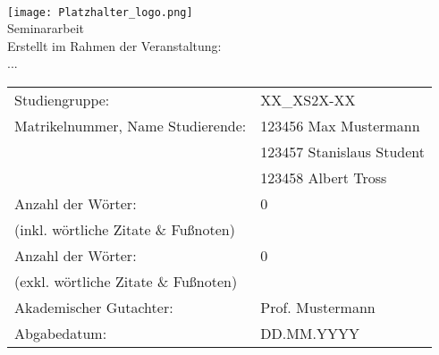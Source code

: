 \begin{center}
     \\[3ex]
    \texttt{[image: Platzhalter\_logo.png]} \\[3ex]%
    \large{Seminararbeit} \\ [-10pt]%
    \large{Erstellt im Rahmen der Veranstaltung:} \\ [-10pt]
    \large{...}
\end{center}

\renewcommand{\arraystretch}{2.5}
\begin{table}[h]
    \setlength{\tabcolsep}{22pt}
    \begin{tabularx}{\textwidth}{l l}
        Studiengruppe:                       & XX\_XS2X-XX               \\
        Matrikelnummer, Name Studierende:    & 123456 Max Mustermann     \\ [-15pt]
        ~                                    & 123457 Stanislaus Student \\ [-15pt]
        ~                                    & 123458 Albert Tross       \\
        Anzahl der Wörter:                   & 0                         \\ [-15pt]
        (inkl. wörtliche Zitate \& Fußnoten) & ~                         \\
        Anzahl der Wörter:                   & 0                         \\ [-15pt]
        (exkl. wörtliche Zitate \& Fußnoten) & ~                         \\
        Akademischer Gutachter:              & Prof. Mustermann          \\
        Abgabedatum:                         & DD.MM.YYYY                \\
    \end{tabularx}
\end{table}

\newpage